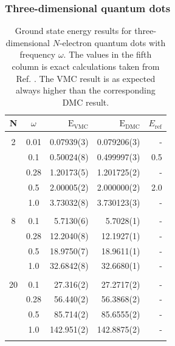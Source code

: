 \setlength{\tabcolsep}{6pt}


\clearpage
\subsubsection{Three-dimensional quantum dots}

\setlength{\tabcolsep}{1.05cm}
\begin{table}
\begin{center}
\begin{tabular}{cc|rrr}
    N     & $\omega$ & $\mathrm{E_{VMC}}$ & $\mathrm{E_{DMC}}$ & $E_\mathrm{ref}$\\
\hline\hline
\multicolumn{5}{c}{} \\
    2     &   0.01   & 0.07939(3)  & 0.079206(3) & -		\\
          &   0.1    & 0.50024(8)  & 0.499997(3) & 0.5        \\
          &   0.28   & 1.20173(5)  & 1.201725(2) & -		\\
          &   0.5    & 2.00005(2)  & 2.000000(2) & 2.0 \\
          &   1.0    & 3.73032(8)  & 3.730123(3) & - \\
\cline{2-5}
\multicolumn{5}{c}{} \\
    8     &   0.1    & 5.7130(6)   & 5.7028(1)   & - 		\\
          &   0.28   & 12.2040(8)  & 12.1927(1)  & -		\\
          &   0.5    & 18.9750(7)  & 18.9611(1)  & -\\
          &   1.0    & 32.6842(8)  & 32.6680(1)  & -\\
\cline{2-5}
\multicolumn{5}{c}{} \\
    20    &   0.1    & 27.316(2)   & 27.2717(2)   & - 		\\
          &   0.28   & 56.440(2)   & 56.3868(2)   & -		\\
          &   0.5    & 85.714(2)   & 85.6555(2)   & - \\
          &   1.0    & 142.951(2)  & 142.8875(2)  & -\\
\cline{2-5}
\multicolumn{5}{c}{} \\
\hline\hline
\end{tabular}
\caption{Ground state energy results for three-dimensional $N$-electron quantum dots with frequency $\omega$. The values in the fifth column is exact calculations taken from Ref. \cite{taut}. The VMC result is as expected always higher than the corresponding DMC result.}
\label{tab:QDotsResults3D}
\end{center}
\end{table}
\setlength{\tabcolsep}{6pt}

